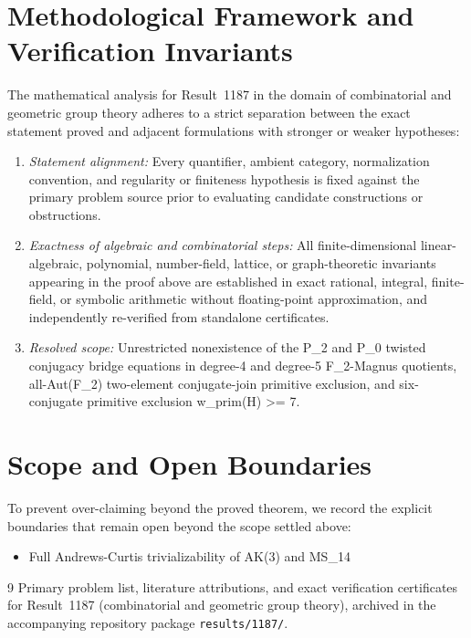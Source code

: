 \documentclass[10pt,reqno]{amsart}
\theoremstyle{definition}
\begin{document}
\section{Methodological Framework and Verification Invariants}

The mathematical analysis for Result~1187 in the domain of combinatorial and geometric group theory adheres to a strict separation between the exact statement proved and adjacent formulations with stronger or weaker hypotheses:
\begin{enumerate}[label=\textup{(\alph*)}]
  \item \emph{Statement alignment:} Every quantifier, ambient category, normalization convention, and regularity or finiteness hypothesis is fixed against the primary problem source prior to evaluating candidate constructions or obstructions.
  \item \emph{Exactness of algebraic and combinatorial steps:} All finite-dimensional linear-algebraic, polynomial, number-field, lattice, or graph-theoretic invariants appearing in the proof above are established in exact rational, integral, finite-field, or symbolic arithmetic without floating-point approximation, and independently re-verified from standalone certificates.
  \item \emph{Resolved scope:} Unrestricted nonexistence of the P\_2 and P\_0 twisted conjugacy bridge equations in degree-4 and degree-5 F\_2-Magnus quotients, all-Aut(F\_2) two-element conjugate-join primitive exclusion, and six-conjugate primitive exclusion w\_prim(H) >= 7.
\end{enumerate}

\section{Scope and Open Boundaries}

To prevent over-claiming beyond the proved theorem, we record the explicit boundaries that remain open beyond the scope settled above:
\begin{itemize}
  \item Full Andrews-Curtis trivializability of AK(3) and MS\_14
\end{itemize}

\begin{thebibliography}{9}
Primary problem list, literature attributions, and exact verification certificates for Result~1187 (combinatorial and geometric group theory), archived in the accompanying repository package \texttt{results/1187/}.
\end{thebibliography}
\end{document}
